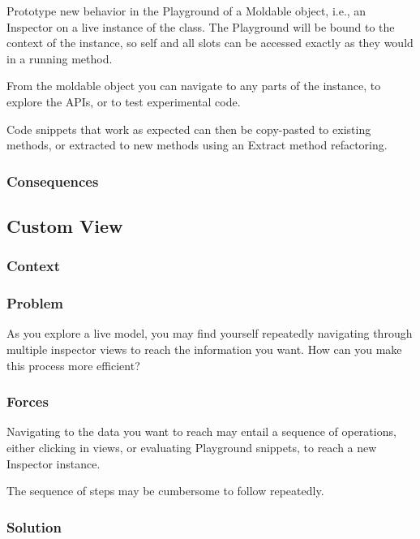 \documentclass[sigconf]{acmart}
\begin{document}
Prototype new behavior in the Playground of a Moldable object, i.e., an Inspector on a live instance of the class. The Playground will be bound to the context of the instance, so self and all slots can be accessed exactly as they would in a running method.

From the moldable object you can navigate to any parts of the instance, to explore the APIs, or to test experimental code.

Code snippets that work as expected can then be copy-pasted to existing methods, or extracted to new methods using an Extract method refactoring.



\subsubsection*{Consequences}


\subsection*{Custom View}\label{pat:customView}
\subsubsection*{Context}
\subsubsection*{Problem}

As you explore a live model, you may find yourself repeatedly navigating through multiple inspector views to reach the information you want. How can you make this process more efficient?


\subsubsection*{Forces}

Navigating to the data you want to reach may entail a sequence of operations, either clicking in views, or evaluating Playground snippets, to reach a new Inspector instance.

The sequence of steps may be cumbersome to follow repeatedly.



\subsubsection*{Solution}
\end{document}
